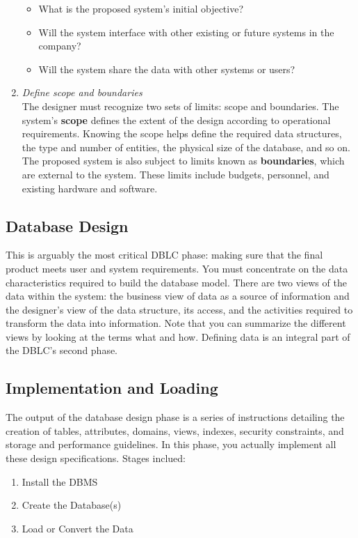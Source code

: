 \documentclass[a4paper, 12pt, titlepage]{report}
\begin{document}
\begin{enumerate}
\begin{itemize}
\item What is the proposed system’s initial objective?
\item Will the system interface with other existing or future systems in the company?
\item Will the system share the data with other systems or users?
\end{itemize}
\item \emph{Define scope and boundaries} \\
The designer must recognize two sets of limits: scope and boundaries. The system’s \textbf{scope} defines the extent of the design according to operational requirements. Knowing the scope helps define the required data structures, the type and number of entities, the physical size of the database, and so on. The proposed system is also subject to limits known as \textbf{boundaries}, which are external to the system. These limits include budgets, personnel, and existing hardware and software.
\end{enumerate}
\subsection{Database Design}
This is arguably the most critical DBLC phase: making sure that the final product meets user and system requirements. You must concentrate on the data characteristics required to build the database model. There are two views of the data within the system: the business view of data as a source of information and the designer’s view of the data structure, its access, and the activities required to transform the data into information. Note that you can summarize the different views by looking at the terms what and how. Defining data is an integral part of the DBLC’s second phase.
\subsection{Implementation and Loading}
The output of the database design phase is a series of instructions detailing the creation of tables, attributes, domains, views, indexes, security constraints, and storage and performance guidelines. In this phase, you actually implement all these design specifications. Stages inclued:
\begin{enumerate}
\item Install the DBMS
\item Create the Database(s)
\item Load or Convert the Data
\end{enumerate}
\end{document}
